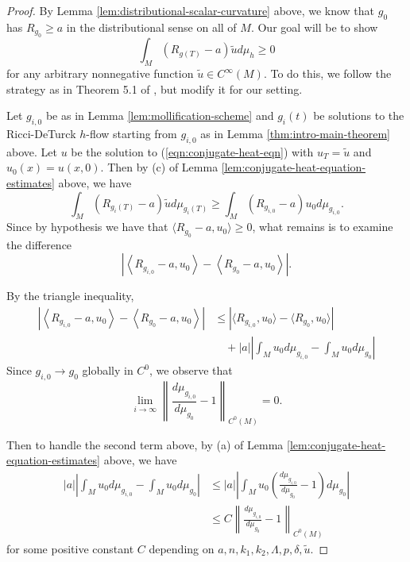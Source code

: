 \documentclass[12pt]{amsart}
\theoremstyle{plain}
\theoremstyle{plain}
\theoremstyle{definition}
\theoremstyle{remark}
\numberwithin{equation}{subsection}
\begin{document}
\begin{proof}
    By Lemma \ref{lem:distributional-scalar-curvature} above, we know that $g_0$ has $R_{g_0} \geq a$ in the distributional sense on all of $M$. Our goal will be to show
    \begin{equation*}
        \int_M (R_{g(T)}-a)\tilde{u}d\mu_h \geq 0
    \end{equation*}
    for any arbitrary nonnegative function $\tilde{u}\in C^\infty(M)$. To do this, we follow the strategy as in Theorem 5.1 of \cite{jiang_weak_2021}, but modify it for our setting. 
    
    Let $g_{i,0}$ be as in Lemma \ref{lem:mollification-scheme} and $g_i(t)$ be solutions to the Ricci-DeTurck $h$-flow starting from $g_{i,0}$ as in Lemma \ref{thm:intro-main-theorem} above. Let $u$ be the solution to (\ref{eqn:conjugate-heat-eqn}) with $u_T = \tilde{u}$ and $u_0(x) = u(x,0)$. Then by (c) of Lemma \ref{lem:conjugate-heat-equation-estimates} above, we have
    \begin{equation}\label{eqn:scalar-monotonicity}
        \int_M (R_{g_i(T)}-a)\tilde{u}d\mu_{g_i(T)} \geq \int_M (R_{g_{i,0}}-a)u_0d\mu_{g_{i,0}}.
    \end{equation}
    Since by hypothesis we have that $\langle R_{g_0} - a,u_0\rangle \geq 0$, what remains is to examine the difference
    \begin{equation*}
        \left|\left\langle R_{g_{i,0}}-a, u_0\right\rangle - \left\langle R_{g_0} - a, u_0\right\rangle \right|.
    \end{equation*}

    By the triangle inequality,
    \begin{align*}
        \left|\left\langle R_{g_{i,0}}-a, u_0\right\rangle - \left\langle R_{g_0} - a, u_0\right\rangle \right| &\leq \left|\langle R_{g_{i,0}},u_0\rangle - \langle R_{g_0}, u_0\rangle\right| \nonumber \\
        &\quad + |a|\left|\int_M u_0 d\mu_{g_{i,0}} - \int_M u_0 d\mu_{g_0}\right|
    \end{align*}
    Since $g_{i,0} \to g_0$ globally in $C^0$, we observe that 
    \begin{equation*}
        \lim\limits_{i\to\infty}\left\lVert \frac{d\mu_{g_{i,0}}}{d\mu_{g_0}} - 1\right\rVert_{C^0(M)} = 0.
    \end{equation*}

    Then to handle the second term above, by (a) of Lemma \ref{lem:conjugate-heat-equation-estimates} above, we have
    \begin{align*}
        |a|\left|\int_M u_0 d\mu_{g_{i,0}} - \int_M u_0 d\mu_{g_0}\right| &\leq |a|\left|\int_M u_0\left(\frac{d\mu_{g_{i,0}}}{d\mu_{g_0}} - 1\right)d\mu_{g_0}\right| \nonumber \\
        &\leq C\left\lVert \frac{d\mu_{g_{i,0}}}{d\mu_{g_0}} - 1\right\rVert_{C^0(M)}
    \end{align*}
    for some positive constant $C$ depending on $a, n, k_1, k_2, \Lambda, p, \delta, \tilde{u}$.


\end{proof}
\end{document}
